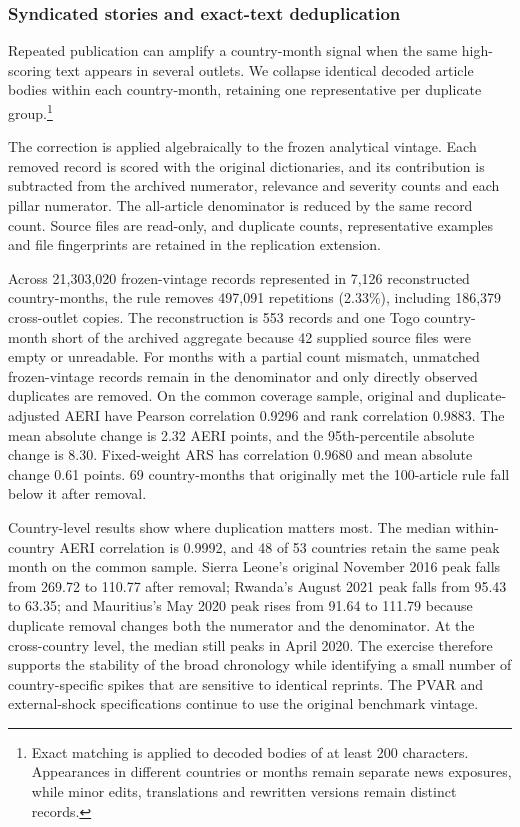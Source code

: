 \documentclass[12pt]{article}
\begin{document}
\subsubsection{Syndicated stories and exact-text deduplication}\label{sec:deduplication}
Repeated publication can amplify a country-month signal when the same high-scoring text appears in several outlets. We collapse identical decoded article bodies within each country-month, retaining one representative per duplicate group.\footnote{Exact matching is applied to decoded bodies of at least 200 characters. Appearances in different countries or months remain separate news exposures, while minor edits, translations and rewritten versions remain distinct records.}

The correction is applied algebraically to the frozen analytical vintage. Each removed record is scored with the original dictionaries, and its contribution is subtracted from the archived numerator, relevance and severity counts and each pillar numerator. The all-article denominator is reduced by the same record count. Source files are read-only, and duplicate counts, representative examples and file fingerprints are retained in the replication extension.

Across 21,303,020 frozen-vintage records represented in 7,126 reconstructed country-months, the rule removes 497,091 repetitions (2.33\%), including 186,379 cross-outlet copies. The reconstruction is 553 records and one Togo country-month short of the archived aggregate because 42 supplied source files were empty or unreadable. For months with a partial count mismatch, unmatched frozen-vintage records remain in the denominator and only directly observed duplicates are removed. On the common coverage sample, original and duplicate-adjusted AERI have Pearson correlation 0.9296 and rank correlation 0.9883. The mean absolute change is 2.32 AERI points, and the 95th-percentile absolute change is 8.30. Fixed-weight ARS has correlation 0.9680 and mean absolute change 0.61 points. 69 country-months that originally met the 100-article rule fall below it after removal.



Country-level results show where duplication matters most. The median within-country AERI correlation is 0.9992, and 48 of 53 countries retain the same peak month on the common sample. Sierra Leone's original November 2016 peak falls from 269.72 to 110.77 after removal; Rwanda's August 2021 peak falls from 95.43 to 63.35; and Mauritius's May 2020 peak rises from 91.64 to 111.79 because duplicate removal changes both the numerator and the denominator. At the cross-country level, the median still peaks in April 2020. The exercise therefore supports the stability of the broad chronology while identifying a small number of country-specific spikes that are sensitive to identical reprints. The PVAR and external-shock specifications continue to use the original benchmark vintage.
\end{document}
